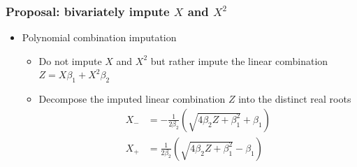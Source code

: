 \documentclass{beamer}
\begin{document}
\begin{frame}
{\begin{tabular}{lcccccrl}
\hline
\end{tabular}
}

 \end{frame}
 
\begin{frame}
  \frametitle{Proposal: bivariately impute $X$ and $X^2$}
    \begin{itemize}
  \item Polynomial combination imputation
  \begin{itemize}
  \item Do not impute $X$ and $X^2$ but rather impute the linear combination $Z=X\beta_1 + X^2\beta_2$
  \item Decompose the imputed linear combination $Z$ into the distinct real roots
  \begin{align*}
 X_-  &=-\frac{1}{2\beta_2} \left ( \sqrt{4\beta_2Z + \beta_1^2} +\beta_1 \right )
\\  X_+   &= \frac{1}{2\beta_2} \left ( \sqrt{4\beta_2Z + \beta_1^2}-\beta_1\right  )
\end{align*}
  \end{itemize}
  \end{itemize}
 \end{frame}
 
\end{document}
